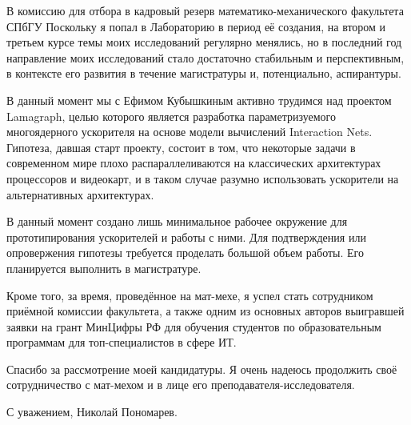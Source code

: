 \documentclass[foldmarks=false, enlargefirstpage=true,
    firstfoot=false, fromphone, fromemail, version=last]{scrlttr2}
\begin{document}
\begin{letter}{В комиссию для отбора в кадровый резерв математико-механического факультета СПбГУ}
    Поскольку я попал в Лабораторию в период её создания, на втором и третьем курсе темы моих исследований регулярно менялись, но в последний год направление моих исследований стало достаточно стабильным и перспективным, в контексте его развития в течение магистратуры и, потенциально, аспирантуры.

    В данный момент мы с Ефимом Кубышкиным активно трудимся над проектом Lamagraph, целью которого является разработка параметризуемого многоядерного ускорителя на основе модели вычислений \textenglish{Interaction Nets}.
    Гипотеза, давшая старт проекту, состоит в том, что некоторые задачи в современном мире плохо распараллеливаются на классических архитектурах процессоров и видеокарт, и в таком случае разумно использовать ускорители на альтернативных архитектурах.

    В данный момент создано лишь минимальное рабочее окружение для прототипирования ускорителей и работы с ними.
    Для подтверждения или опровержения гипотезы требуется проделать большой объем работы.
    Его планируется выполнить в магистратуре.

    Кроме того, за время, проведённое на мат-мехе, я успел стать сотрудником приёмной комиссии факультета, а также одним из основных авторов выигравшей заявки на грант МинЦифры РФ для обучения студентов по образовательным программам для топ-специалистов в сфере ИТ.

    Спасибо за рассмотрение моей кандидатуры.
    Я очень надеюсь продолжить своё сотрудничество с мат-мехом и в лице его преподавателя-исследователя.

    \closing{С уважением, Николай Пономарев.}
\end{letter}
\end{document}
